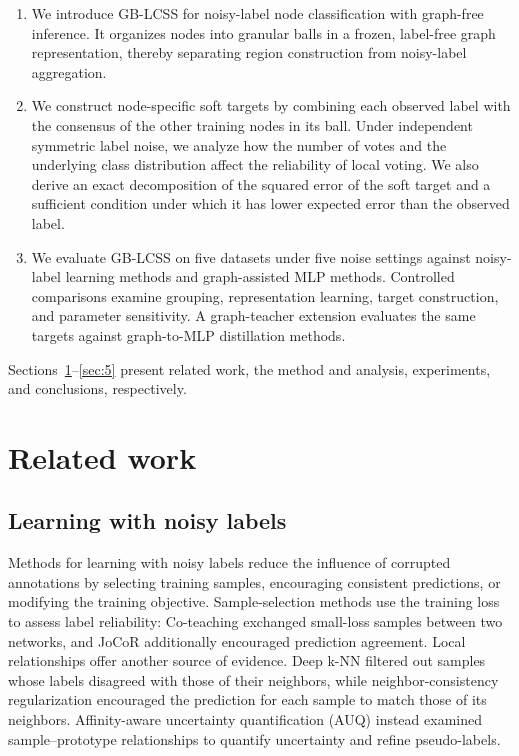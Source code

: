 \documentclass[times,review,10pt]{elsarticle}
\theoremstyle{definition}
\theoremstyle{plain}
\begin{document}
\begin{enumerate}[label=(\arabic*)]
\item We introduce GB-LCSS for noisy-label node classification with graph-free inference. It organizes nodes into granular balls in a frozen, label-free graph representation, thereby separating region construction from noisy-label aggregation.
\item We construct node-specific soft targets by combining each observed label with the consensus of the other training nodes in its ball. Under independent symmetric label noise, we analyze how the number of votes and the underlying class distribution affect the reliability of local voting. We also derive an exact decomposition of the squared error of the soft target and a sufficient condition under which it has lower expected error than the observed label.
\item We evaluate GB-LCSS on five datasets under five noise settings against noisy-label learning methods and graph-assisted MLP methods. Controlled comparisons examine grouping, representation learning, target construction, and parameter sensitivity. A graph-teacher extension evaluates the same targets against graph-to-MLP distillation methods.
\end{enumerate}

Sections~\ref{sec:2}--\ref{sec:5} present related work, the method and analysis, experiments, and conclusions, respectively.

\section{Related work}\label{sec:2}

\subsection{Learning with noisy labels}\label{sec:2.1}

Methods for learning with noisy labels reduce the influence of corrupted annotations by selecting training samples, encouraging consistent predictions, or modifying the training objective. Sample-selection methods use the training loss to assess label reliability: Co-teaching \cite{ref17} exchanged small-loss samples between two networks, and JoCoR \cite{ref18} additionally encouraged prediction agreement. Local relationships offer another source of evidence. Deep k-NN \cite{ref11} filtered out samples whose labels disagreed with those of their neighbors, while neighbor-consistency regularization \cite{ref10} encouraged the prediction for each sample to match those of its neighbors. Affinity-aware uncertainty quantification (AUQ) \cite{pr2026auq} instead examined sample--prototype relationships to quantify uncertainty and refine pseudo-labels.
\end{document}
